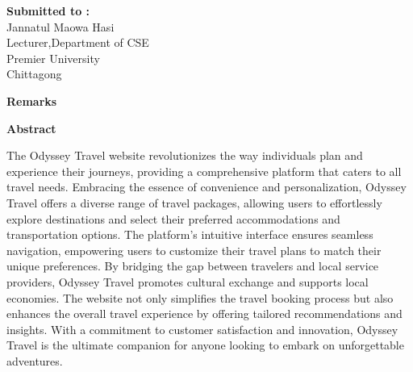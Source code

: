 \documentclass{scrreprt}
\begin{document}
\begin{titlepage}
\begin{minipage}[t]{0.5\textwidth}
        \textbf{Submitted to :}
        \\Jannatul Maowa Hasi
        \\Lecturer,Department of CSE
        \\ Premier University
        \\ Chittagong
    \end{minipage}%
    \begin{minipage}[t]{0.6\textwidth}
        \raggedleft
        \textbf{Remarks}\\
        \vspace{0.5cm} %
    \end{minipage}

    \date{\today}
    \vfill
\end{titlepage}
\newpage

\begin{center}
    \parbox{0.8\textwidth}{ 
        \centering
        \textbf{Abstract}
    }
\end{center}

The Odyssey Travel website revolutionizes the way individuals plan and experience their journeys, providing a comprehensive platform that caters to all travel needs. Embracing the essence of convenience and personalization, Odyssey Travel offers a diverse range of travel packages, allowing users to effortlessly explore destinations and select their preferred accommodations and transportation options. The platform’s intuitive interface ensures seamless navigation, empowering users to customize their travel plans to match their unique preferences. By bridging the gap between travelers and local service providers, Odyssey Travel promotes cultural exchange and supports local economies. The website not only simplifies the travel booking process but also enhances the overall travel experience by offering tailored recommendations and insights. With a commitment to customer satisfaction and innovation, Odyssey Travel is the ultimate companion for anyone looking to embark on unforgettable adventures.
\end{document}
